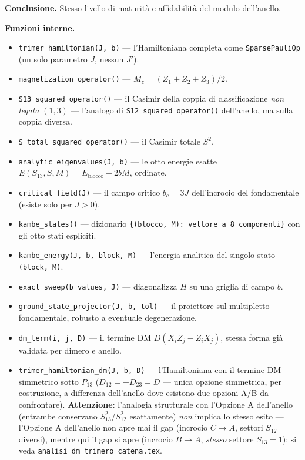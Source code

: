 \documentclass[11pt,a4paper]{article}
\begin{document}
\textbf{Conclusione.} Stesso livello di maturità e affidabilità del modulo
dell'anello.

\textbf{Funzioni interne.}
\begin{itemize}
\item \texttt{trimer\_hamiltonian(J,\ b)} — l'Hamiltoniana completa come
\texttt{SparsePauliOp} (un solo parametro $J$, nessun $J'$).
\item \texttt{magnetization\_operator()} — $M_z=(Z_1+Z_2+Z_3)/2$.
\item \texttt{S13\_squared\_operator()} — il Casimir della coppia di
classificazione \emph{non legata} $(1,3)$ — l'analogo di
\texttt{S12\_squared\_operator()} dell'anello, ma sulla coppia diversa.
\item \texttt{S\_total\_squared\_operator()} — il Casimir totale $S^2$.
\item \texttt{analytic\_eigenvalues(J,\ b)} — le otto energie esatte
$E(S_{13},S,M)=E_\text{blocco}+2bM$, ordinate.
\item \texttt{critical\_field(J)} — il campo critico $b_c=3J$ dell'incrocio del
fondamentale (esiste solo per $J>0$).
\item \texttt{kambe\_states()} — dizionario \texttt{\{(blocco, M): vettore a 8
componenti\}} con gli otto stati espliciti.
\item \texttt{kambe\_energy(J,\ b,\ block,\ M)} — l'energia analitica del singolo
stato \texttt{(block, M)}.
\item \texttt{exact\_sweep(b\_values,\ J)} — diagonalizza $H$ su una griglia di
campo $b$.
\item \texttt{ground\_state\_projector(J,\ b,\ tol)} — il proiettore sul
multipletto fondamentale, robusto a eventuale degenerazione.
\item \texttt{dm\_term(i,\ j,\ D)} — il termine DM $D(X_iZ_j-Z_iX_j)$, stessa
forma già validata per dimero e anello.
\item \texttt{trimer\_hamiltonian\_dm(J,\ b,\ D)} — l'Hamiltoniana con il termine
DM simmetrico sotto $P_{13}$ ($D_{12}=-D_{23}=D$ — unica opzione simmetrica, per
costruzione, a differenza dell'anello dove esistono due opzioni A/B da confrontare).
\textbf{Attenzione}: l'analogia strutturale con l'Opzione A dell'anello (entrambe
conservano $S_{13}^2$/$S_{12}^2$ esattamente) \emph{non} implica lo stesso esito —
l'Opzione A dell'anello non apre mai il gap (incrocio $C\to A$, settori $S_{12}$
diversi), mentre qui il gap si apre (incrocio $B\to A$, \emph{stesso} settore
$S_{13}=1$): si veda \texttt{analisi\_dm\_trimero\_catena.tex}.

\end{itemize}
\end{document}
